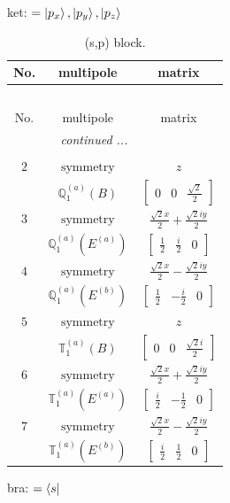 \documentclass[fleqn,8pt,landscape]{jsarticle}
\begin{document}
\noindent
ket: $=\ket{p_{x}}, \ket{p_{y}}, \ket{p_{z}}$
\renewcommand{\arraystretch}{1.6}
\begin{longtable}{ccc}
\caption{(s,p) block.}
 \\
 \hline \hline
No. & multipole & matrix \\ \hline \endfirsthead

\multicolumn{2}{l}{\tablename\ \thetable{}} \\
 \hline \hline
No. & multipole & matrix \\ \hline \endhead

 \hline \hline
\multicolumn{2}{r}{\footnotesize\it continued ...} \\ \endfoot

 \hline \hline
\multicolumn{2}{r}{} \\ \endlastfoot

$ 2 $ & $ \text{symmetry} $ & $ z $ \\
$  $ & $ \mathbb{Q}_{1}^{(a)}(B) $ & $ \begin{bmatrix} 0 & 0 & \frac{\sqrt{2}}{2} \end{bmatrix} $ \\ \hline
$ 3 $ & $ \text{symmetry} $ & $ \frac{\sqrt{2} x}{2} + \frac{\sqrt{2} i y}{2} $ \\
$  $ & $ \mathbb{Q}_{1}^{(a)}(E^{(a)}) $ & $ \begin{bmatrix} \frac{1}{2} & \frac{i}{2} & 0 \end{bmatrix} $ \\ \hline
$ 4 $ & $ \text{symmetry} $ & $ \frac{\sqrt{2} x}{2} - \frac{\sqrt{2} i y}{2} $ \\
$  $ & $ \mathbb{Q}_{1}^{(a)}(E^{(b)}) $ & $ \begin{bmatrix} \frac{1}{2} & - \frac{i}{2} & 0 \end{bmatrix} $ \\ \hline
$ 5 $ & $ \text{symmetry} $ & $ z $ \\
$  $ & $ \mathbb{T}_{1}^{(a)}(B) $ & $ \begin{bmatrix} 0 & 0 & \frac{\sqrt{2} i}{2} \end{bmatrix} $ \\ \hline
$ 6 $ & $ \text{symmetry} $ & $ \frac{\sqrt{2} x}{2} + \frac{\sqrt{2} i y}{2} $ \\
$  $ & $ \mathbb{T}_{1}^{(a)}(E^{(a)}) $ & $ \begin{bmatrix} \frac{i}{2} & - \frac{1}{2} & 0 \end{bmatrix} $ \\ \hline
$ 7 $ & $ \text{symmetry} $ & $ \frac{\sqrt{2} x}{2} - \frac{\sqrt{2} i y}{2} $ \\
$  $ & $ \mathbb{T}_{1}^{(a)}(E^{(b)}) $ & $ \begin{bmatrix} \frac{i}{2} & \frac{1}{2} & 0 \end{bmatrix} $ \\ \hline
\end{longtable}
bra: $=\bra{s}$
\end{document}

